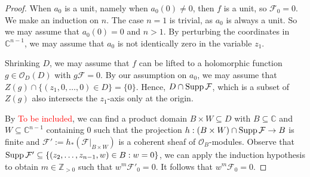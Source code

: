 \begin{proof}
    When $a_0$ is a unit, namely when $a_0(0)\neq 0$, then $f$ is a unit, so $\mathcal{F}_0=0$. We make an induction on $n$. The case $n=1$ is trivial, as $a_0$ is always a unit.
    So we may assume that $a_0(0)=0$ and $n>1$. By perturbing the coordinates in $\mathbb{C}^{n-1}$, we may assume that $a_0$ is not identically zero in the variable $z_1$. 
    
    Shrinking $D$, we may assume that $f$ can be lifted to a holomorphic function $g\in \mathcal{O}_D(D)$ with $g\mathcal{F}=0$. By our assumption on $a_0$, we may assume that $Z(g)\cap \{(z_1,0,\ldots,0)\in D\}=\{0\}$. Hence, $D\cap \operatorname{Supp} \mathcal{F}$, which is a subset of $Z(g)$ also intersects the $z_1$-axis only at the origin.

    By \textcolor{red}{To be included}, we can find a product domain $B\times W\subseteq D$ with $B\subseteq \mathbb{C}$ and $W\subseteq \mathbb{C}^{n-1}$ containing $0$ such that the projection $h:(B\times W)\cap \operatorname{Supp} \mathcal{F}\rightarrow B$ is finite and $\mathcal{F}':=h_*(\mathcal{F}|_{B\times W})$ is a coherent sheaf of $\mathcal{O}_B$-modules. Observe that $\operatorname{Supp} \mathcal{F}'\subseteq \{(z_2,\ldots,z_{n-1},w)\in B:w=0\}$, we can apply the induction hypothesis to obtain $m\in \mathbb{Z}_{>0}$ such that $w^{m}\mathcal{F}'_0=0$. It follows that $w^{m}\mathcal{F}_0=0$.
\end{proof}
\fi



\printbibliography
